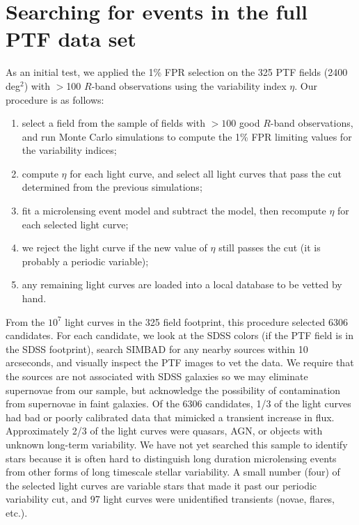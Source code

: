 \documentclass[12pt,preprint]{aastex}
\newcommand{\apwsim}{\raisebox{0.2ex}{\scriptsize$\sim$\normalsize}}
\begin{document}
\section{Searching for events in the full PTF data set}
As an initial test, we applied the 1\% FPR selection on the 325 PTF fields (\apwsim2400 deg$^2$) with $>$100 $R$-band observations using the variability index $\eta$. Our procedure is as follows:
\begin{enumerate}
	\item select a field from the sample of fields with $>100$ good $R$-band observations, and run Monte Carlo simulations to compute the 1\% FPR limiting values for the variability indices;
	\item compute $\eta$ for each light curve, and select all light curves that pass the cut determined from the previous simulations;
	\item fit a microlensing event model and subtract the model, then recompute $\eta$ for each selected light curve;
	\item we reject the light curve if the new value of $\eta$ still passes the cut (it is probably a periodic variable);
	\item any remaining light curves are loaded into a local database to be vetted by hand.
\end{enumerate}

From the \apwsim$10^7$ light curves in the 325 field footprint, this procedure selected 6306 candidates. For each candidate, we look at the SDSS colors (if the PTF field is in the SDSS footprint), search SIMBAD for any nearby sources within 10 arcseconds, and visually inspect the PTF images to vet the data. We require that the sources are not associated with SDSS galaxies so we may eliminate supernovae from our sample, but acknowledge the possibility of contamination from supernovae in faint galaxies. Of the 6306 candidates, \apwsim1/3 of the light curves had bad or poorly calibrated data that mimicked a transient increase in flux. Approximately 2/3 of the light curves were quasars, AGN, or objects with unknown long-term variability. We have not yet searched this sample to identify stars because it is often hard to distinguish long duration microlensing events from other forms of long timescale stellar variability. A small number (four) of the selected light curves are variable stars that made it past our periodic variability cut, and 97 light curves were unidentified transients (novae, flares, etc.). 
\end{document}
